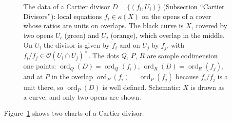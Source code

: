 \documentclass[12pt]{article}
\numberwithin{equation}{section}
\theoremstyle{definition}
\theoremstyle{remark}
\newcommand{\Ocal}{\mathcal{O}}
\newcommand{\ord}{\operatorname{ord}}
\begin{document}
\begin{figure}[H]
\centering

\caption{The data of a Cartier divisor $D=\{(f_i,U_i)\}$ (Subsection ``Cartier Divisors''): local equations $f_i\in\kappa(X)$ on the opens of a cover whose ratios are units on overlaps. The black curve is $X$, covered by two opens $U_i$ (green) and $U_j$ (orange), which overlap in the middle. On $U_i$ the divisor is given by $f_i$ and on $U_j$ by $f_j$, with $f_i/f_j\in\Ocal(U_i\cap U_j)^{\times}$. The dots $Q$, $P$, $R$ are sample codimension one points: $\ord_Q(D)=\ord_Q(f_i)$, $\ord_R(D)=\ord_R(f_j)$, and at $P$ in the overlap $\ord_P(f_i)=\ord_P(f_j)$ because $f_i/f_j$ is a unit there, so $\ord_P(D)$ is well defined. Schematic: $X$ is drawn as a curve, and only two opens are shown.}\label{fig:cartier-local-equations}
\end{figure}
Figure~\ref{fig:cartier-local-equations} shows two charts of a Cartier divisor.
\end{document}
